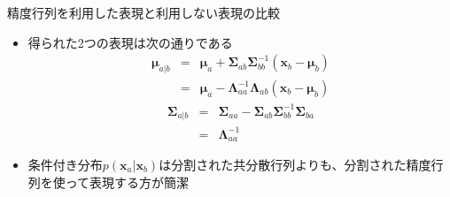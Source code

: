 \begin{frame}{精度行列を利用した表現と利用しない表現の比較}
 \begin{itemize}
  \item 得られた2つの表現は次の通りである
        \begin{eqnarray*}
         \bm{\mu}_{a|b} &=& \bm{\mu}_a + \bm{\Sigma}_{ab}\bm{\Sigma}_{bb}^{-1}(\bm{x}_b-\bm{\mu}_b)\\
         &=& \bm{\mu}_a-\bm{\Lambda}_{aa}^{-1}\bm{\Lambda}_{ab}(\bm{x}_b-\bm{\mu}_b)
        \end{eqnarray*}
        \begin{eqnarray*}
         \bm{\Sigma}_{a|b} &=& \bm{\Sigma}_{aa} - \bm{\Sigma}_{ab}\bm{\Sigma}_{bb}^{-1}\bm{\Sigma}_{ba} \\
         & =& \bm{\Lambda}_{aa}^{-1}
        \end{eqnarray*}
  \item 条件付き分布$p(\bm{x}_a|\bm{x}_b)$は分割された共分散行列よりも、分割された精度行列を使って表現する方が簡潔
 \end{itemize}
\end{frame}
